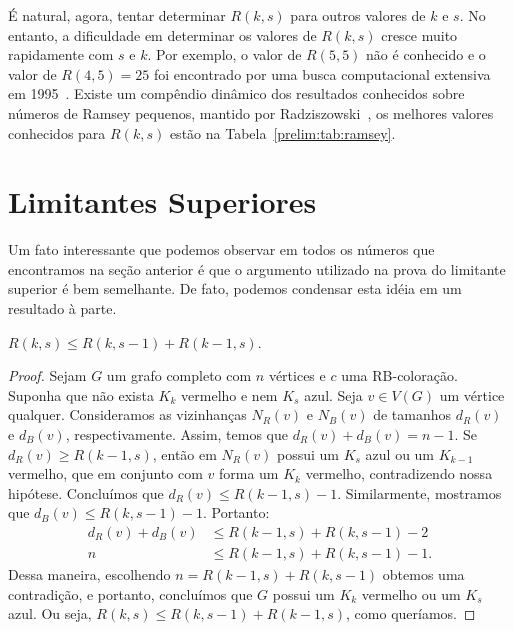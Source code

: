 É natural, agora, tentar determinar $R(k,s)$ para outros valores de $k$ e $s$. No entanto, a dificuldade em determinar os valores de $R(k,s)$ cresce muito rapidamente com $s$ e $k$. Por exemplo, o valor de $R(5,5)$ não é conhecido e o valor de $R(4,5) = 25$ foi encontrado por uma busca computacional extensiva em 1995~\cite{rad45}. Existe um compêndio dinâmico dos resultados conhecidos sobre números de Ramsey pequenos, mantido por Radziszowski~\cite{small_ramsey}, os melhores valores conhecidos para $R(k,s)$ estão na Tabela~\ref{prelim:tab:ramsey}.


\section{Limitantes Superiores}

Um fato interessante que podemos observar em todos os números que encontramos na seção anterior é que o argumento utilizado na prova do limitante superior é bem semelhante. De fato, podemos condensar esta idéia em um resultado à parte.

\begin{theorem}
\label{prelim:thm:inequality}
$R(k,s) \leq R(k,s-1) + R(k-1,s)$.
\end{theorem}
\begin{proof}
Sejam $G$ um grafo completo com $n$ vértices e $c$ uma RB-coloração. Suponha que não exista $K_k$ vermelho e nem $K_s$ azul. Seja $v \in V(G)$ um vértice qualquer. Consideramos as vizinhanças $N_R(v)$ e $N_B(v)$ de tamanhos $d_R(v)$ e $d_B(v)$, respectivamente. Assim, temos que $d_R(v) + d_B(v) = n-1$. Se $d_R(v) \geq R(k-1,s)$, então em $N_R(v)$ possui um $K_s$ azul ou um $K_{k-1}$ vermelho, que em conjunto com $v$ forma um $K_k$ vermelho, contradizendo nossa hipótese. Concluímos que $d_R(v) \leq R(k-1,s) - 1$. Similarmente, mostramos que $d_B(v) \leq R(k,s-1) - 1$. Portanto:
\begin{align*}
d_R(v) + d_B(v) &\leq R(k-1,s) + R(k,s-1) - 2 \\
n &\leq R(k-1,s) + R(k,s-1) - 1.
\end{align*}
Dessa maneira, escolhendo $n = R(k-1,s) + R(k,s-1)$ obtemos uma contradição, e portanto, concluímos que $G$ possui um $K_k$ vermelho ou um $K_s$ azul. Ou seja, $R(k,s) \leq R(k,s-1) + R(k-1,s)$, como queríamos.
\end{proof}

